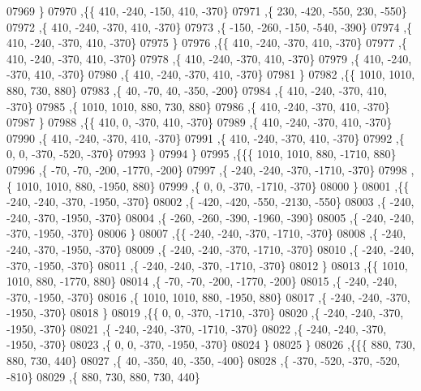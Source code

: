 \begin{DoxyCode}
07969     \}
07970    ,\{\{   410,  -240,  -150,   410,  -370\}
07971     ,\{   230,  -420,  -550,   230,  -550\}
07972     ,\{   410,  -240,  -370,   410,  -370\}
07973     ,\{  -150,  -260,  -150,  -540,  -390\}
07974     ,\{   410,  -240,  -370,   410,  -370\}
07975     \}
07976    ,\{\{   410,  -240,  -370,   410,  -370\}
07977     ,\{   410,  -240,  -370,   410,  -370\}
07978     ,\{   410,  -240,  -370,   410,  -370\}
07979     ,\{   410,  -240,  -370,   410,  -370\}
07980     ,\{   410,  -240,  -370,   410,  -370\}
07981     \}
07982    ,\{\{  1010,  1010,   880,   730,   880\}
07983     ,\{    40,   -70,    40,  -350,  -200\}
07984     ,\{   410,  -240,  -370,   410,  -370\}
07985     ,\{  1010,  1010,   880,   730,   880\}
07986     ,\{   410,  -240,  -370,   410,  -370\}
07987     \}
07988    ,\{\{   410,     0,  -370,   410,  -370\}
07989     ,\{   410,  -240,  -370,   410,  -370\}
07990     ,\{   410,  -240,  -370,   410,  -370\}
07991     ,\{   410,  -240,  -370,   410,  -370\}
07992     ,\{     0,     0,  -370,  -520,  -370\}
07993     \}
07994    \}
07995   ,\{\{\{  1010,  1010,   880, -1710,   880\}
07996     ,\{   -70,   -70,  -200, -1770,  -200\}
07997     ,\{  -240,  -240,  -370, -1710,  -370\}
07998     ,\{  1010,  1010,   880, -1950,   880\}
07999     ,\{     0,     0,  -370, -1710,  -370\}
08000     \}
08001    ,\{\{  -240,  -240,  -370, -1950,  -370\}
08002     ,\{  -420,  -420,  -550, -2130,  -550\}
08003     ,\{  -240,  -240,  -370, -1950,  -370\}
08004     ,\{  -260,  -260,  -390, -1960,  -390\}
08005     ,\{  -240,  -240,  -370, -1950,  -370\}
08006     \}
08007    ,\{\{  -240,  -240,  -370, -1710,  -370\}
08008     ,\{  -240,  -240,  -370, -1950,  -370\}
08009     ,\{  -240,  -240,  -370, -1710,  -370\}
08010     ,\{  -240,  -240,  -370, -1950,  -370\}
08011     ,\{  -240,  -240,  -370, -1710,  -370\}
08012     \}
08013    ,\{\{  1010,  1010,   880, -1770,   880\}
08014     ,\{   -70,   -70,  -200, -1770,  -200\}
08015     ,\{  -240,  -240,  -370, -1950,  -370\}
08016     ,\{  1010,  1010,   880, -1950,   880\}
08017     ,\{  -240,  -240,  -370, -1950,  -370\}
08018     \}
08019    ,\{\{     0,     0,  -370, -1710,  -370\}
08020     ,\{  -240,  -240,  -370, -1950,  -370\}
08021     ,\{  -240,  -240,  -370, -1710,  -370\}
08022     ,\{  -240,  -240,  -370, -1950,  -370\}
08023     ,\{     0,     0,  -370, -1950,  -370\}
08024     \}
08025    \}
08026   ,\{\{\{   880,   730,   880,   730,   440\}
08027     ,\{    40,  -350,    40,  -350,  -400\}
08028     ,\{  -370,  -520,  -370,  -520,  -810\}
08029     ,\{   880,   730,   880,   730,   440\}

\end{DoxyCode}
